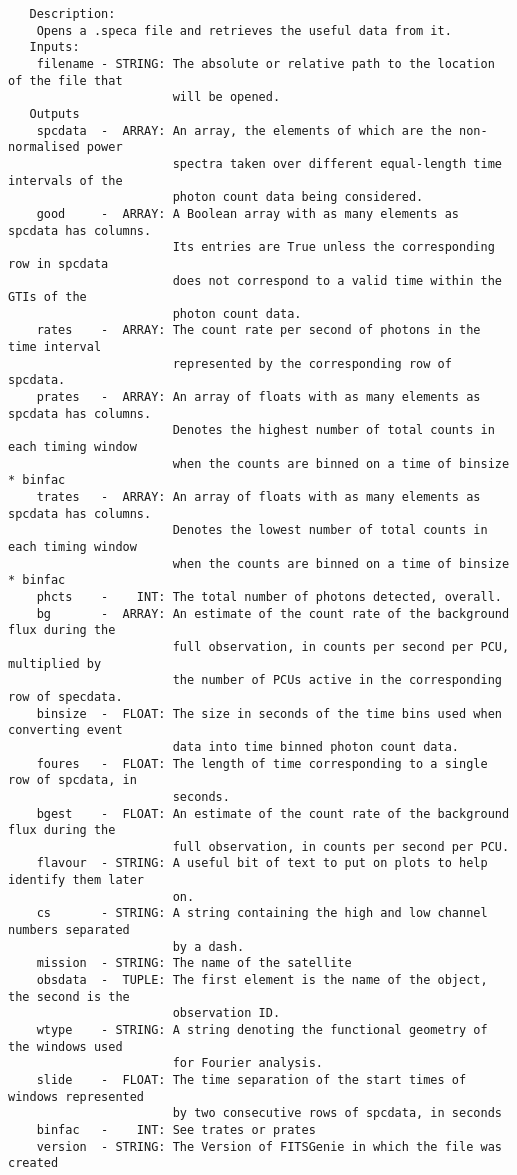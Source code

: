 \begin{verbatim}
   Description:
    Opens a .speca file and retrieves the useful data from it.
   Inputs:
    filename - STRING: The absolute or relative path to the location of the file that
                       will be opened.
   Outputs
    spcdata  -  ARRAY: An array, the elements of which are the non-normalised power
                       spectra taken over different equal-length time intervals of the
                       photon count data being considered.
    good     -  ARRAY: A Boolean array with as many elements as spcdata has columns.
                       Its entries are True unless the corresponding row in spcdata 
                       does not correspond to a valid time within the GTIs of the
                       photon count data.
    rates    -  ARRAY: The count rate per second of photons in the time interval
                       represented by the corresponding row of spcdata.
    prates   -  ARRAY: An array of floats with as many elements as spcdata has columns.
                       Denotes the highest number of total counts in each timing window
                       when the counts are binned on a time of binsize * binfac
    trates   -  ARRAY: An array of floats with as many elements as spcdata has columns.
                       Denotes the lowest number of total counts in each timing window
                       when the counts are binned on a time of binsize * binfac
    phcts    -    INT: The total number of photons detected, overall.
    bg       -  ARRAY: An estimate of the count rate of the background flux during the
                       full observation, in counts per second per PCU, multiplied by
                       the number of PCUs active in the corresponding row of specdata.
    binsize  -  FLOAT: The size in seconds of the time bins used when converting event
                       data into time binned photon count data.
    foures   -  FLOAT: The length of time corresponding to a single row of spcdata, in
                       seconds.
    bgest    -  FLOAT: An estimate of the count rate of the background flux during the
                       full observation, in counts per second per PCU.
    flavour  - STRING: A useful bit of text to put on plots to help identify them later
                       on.
    cs       - STRING: A string containing the high and low channel numbers separated
                       by a dash.
    mission  - STRING: The name of the satellite
    obsdata  -  TUPLE: The first element is the name of the object, the second is the
                       observation ID.
    wtype    - STRING: A string denoting the functional geometry of the windows used
                       for Fourier analysis.
    slide    -  FLOAT: The time separation of the start times of windows represented
                       by two consecutive rows of spcdata, in seconds
    binfac   -    INT: See trates or prates
    version  - STRING: The Version of FITSGenie in which the file was created


\end{verbatim}
